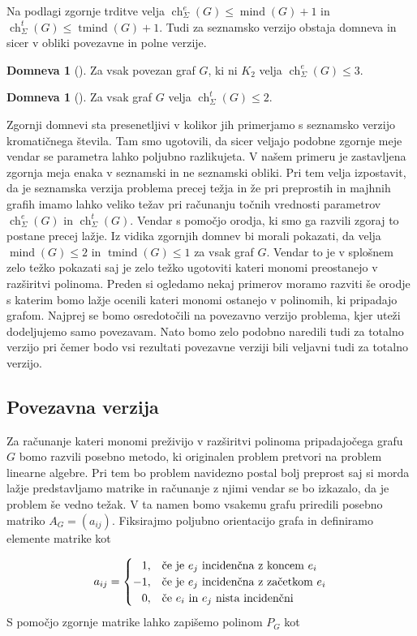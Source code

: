\documentclass[12pt,a4paper,twoside]{article}
\theoremstyle{definition} %
\newtheorem{domneva}[definicija]{Domneva}
\theoremstyle{plain} %
\newcommand{\ecl}{\ch_{\Sigma}^e}
\newcommand{\eclt}{\ch_{\Sigma}^t}
\numberwithin{equation}{section}  %
\DeclareMathOperator{\mind}{mind}
\DeclareMathOperator{\tmind}{tmind}
\DeclareMathOperator{\ch}{ch}
\begin{document}
Na podlagi zgornje trditve velja $\ecl(G) \le \mind(G) + 1$ in $\eclt(G) \le \tmind(G) + 1$. Tudi za seznamsko verzijo obstaja domneva in sicer v obliki povezavne in polne verzije.

 \begin{domneva}[\cite{alg_org}]
Za vsak povezan graf $G$, ki ni $K_2$ velja $\ecl(G) \le 3$.
\end{domneva}

 \begin{domneva}[\cite{algebraic}]
Za vsak  graf $G$ velja $\eclt(G) \le 2$.
\end{domneva}
Zgornji domnevi sta presenetljivi v kolikor jih primerjamo s seznamsko verzijo kromatičnega števila. Tam smo ugotovili, da sicer veljajo podobne zgornje meje vendar se parametra lahko poljubno razlikujeta. V našem primeru je zastavljena zgornja meja enaka v seznamski in ne seznamski obliki. Pri tem velja izpostavit, da je seznamska verzija problema precej težja in že pri preprostih in majhnih grafih imamo lahko veliko težav pri računanju točnih vrednosti parametrov $\ecl(G)$ in $\eclt(G)$. Vendar s pomočjo orodja, ki smo ga razvili zgoraj to postane precej lažje. Iz vidika zgornjih domnev bi morali pokazati, da velja $\mind(G) \le 2 $ in $\tmind(G) \le 1$ za vsak graf $G$. Vendar to je v splošnem zelo težko pokazati saj je zelo težko ugotoviti kateri monomi preostanejo v razširitvi polinoma. Preden si ogledamo nekaj primerov moramo razviti še orodje s katerim bomo lažje ocenili kateri monomi ostanejo v polinomih, ki pripadajo grafom. Najprej se bomo osredotočili na povezavno verzijo problema, kjer uteži dodeljujemo samo povezavam. Nato bomo zelo podobno naredili tudi za totalno verzijo pri čemer bodo vsi rezultati povezavne verziji bili veljavni tudi za totalno verzijo.

\subsection{Povezavna verzija}
Za računanje kateri monomi preživijo v razširitvi polinoma pripadajočega grafu $G$ bomo razvili posebno metodo, ki originalen problem pretvori na problem linearne algebre. Pri tem bo problem navidezno postal bolj preprost saj si morda lažje predstavljamo matrike in računanje z njimi vendar se bo izkazalo, da je problem še vedno težak.
 V ta namen bomo vsakemu grafu priredili posebno matriko $A_G = (a_{ij})$. Fiksirajmo poljubno orientacijo grafa in definiramo elemente matrike kot 

\begin{equation*}
a_{ij} = 
\begin{cases}

\phantom{-}1, & \text{če je $e_j$ incidenčna z koncem $e_i$}\\ 
	-1, & \text{če je $ e_j$ incidenčna z začetkom  $e_i$} \\

\phantom{-}0, & \text{če $e_i$ in $e_j$ nista incidenčni}
\end{cases}
\end{equation*}
S pomočjo zgornje matrike lahko zapišemo polinom $P_G$ kot
\end{document}
